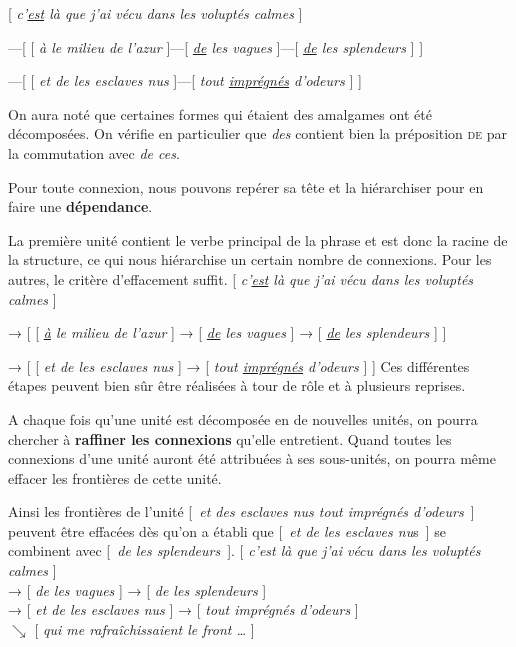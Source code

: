 \ea{}
[ \textit{c’\uline{est} là que j’ai vécu dans les voluptés calmes} ]

—[ [ \textit{à le milieu de l’azur} ]—[ \textit{\uline{de} les vagues} ]—[ \textit{\uline{de} les splendeurs} ] ]

—[ [ \textit{et de les esclaves nus} ]—[ \textit{tout \uline{imprégnés} d’odeurs} ] ]
\z

On aura noté que certaines formes qui étaient des amalgames ont été décomposées. On vérifie en particulier que \textit{des} contient bien la préposition \textsc{de} par la commutation avec \textit{de ces}.

\begin{tblsframed}{}
\noindent Pour toute connexion, nous pouvons repérer sa tête et la hiérarchiser pour en faire une \textbf{dépendance}.
\end{tblsframed}

La première unité contient le verbe principal de la phrase et est donc la racine de la structure, ce qui nous hiérarchise un certain nombre de connexions. Pour les autres, le critère d’effacement suffit.
\ea{}
[ \textit{c’\uline{est} là que j’ai vécu dans les voluptés calmes} ]

→ [ [ \textit{\uline{à} le milieu de l’azur} ] → [ \textit{\uline{de} les vagues} ] → [ \textit{\uline{de} les splendeurs} ] ]

→ [ [ \textit{et de les esclaves nus} ] → [ \textit{tout \uline{imprégnés} d’odeurs} ] ]
\z
Ces différentes étapes peuvent bien sûr être réalisées à tour de rôle et à plusieurs reprises.

\begin{tblsframed}{}
\noindent A chaque fois qu’une unité est décomposée en de nouvelles unités, on pourra chercher à \textbf{raffiner les connexions} qu’elle entretient. Quand toutes les connexions d’une unité auront été attribuées à ses sous-unités, on pourra même effacer les frontières de cette unité.
\end{tblsframed}

Ainsi les frontières de l’unité [~\textit{et des esclaves nus tout imprégnés d’odeurs}~] peuvent être effacées dès qu’on a établi que [~\textit{et de les esclaves nu}s~] se combinent avec [~\textit{de les splendeurs}~].
\ea{} [ \textit{c’est là que j’ai vécu dans les voluptés calmes} ]\\
\glll{}  {→} {[ \textit{de les vagues} ] → [ \textit{de les splendeurs} ]}\\
            {→ [ \textit{et de les esclaves nus} ]} {→} {[ \textit{tout imprégnés d’odeurs} ]}\\
                          {}                          {$\searrow $} {[ \textit{qui me rafraîchissaient le front …} ]}\\
\z

